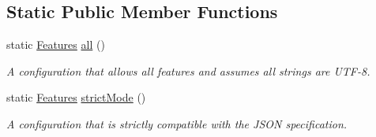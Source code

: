 \subsection*{Static Public Member Functions}
\begin{DoxyCompactItemize}
\item 
static \hyperlink{classJson_1_1Features}{Features} \hyperlink{classJson_1_1Features_a63894da6e2c100b38741fa933f3d33ae}{all} ()
\begin{DoxyCompactList}\small\item\em A configuration that allows all features and assumes all strings are U\+T\+F-\/8. \end{DoxyCompactList}\item 
static \hyperlink{classJson_1_1Features}{Features} \hyperlink{classJson_1_1Features_ae23176c14b2e79e81fb61fb1a8ab58ee}{strict\+Mode} ()
\begin{DoxyCompactList}\small\item\em A configuration that is strictly compatible with the J\+S\+ON specification. \end{DoxyCompactList}\end{DoxyCompactItemize}
